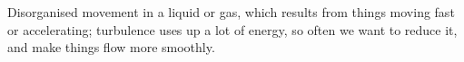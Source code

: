 Disorganised movement in a liquid or gas, which results 
from things moving fast or accelerating; turbulence
uses up a lot of energy, so often we want to reduce it,
and make things flow more smoothly.